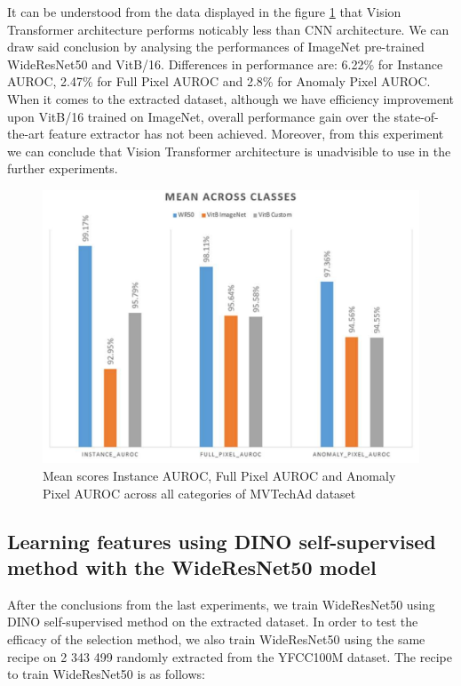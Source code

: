It can be understood from the data displayed in the figure \ref{fig:vit_custom_test} that Vision Transformer architecture performs noticably less than CNN architecture. We can draw said conclusion by analysing the performances of ImageNet pre-trained WideResNet50 and VitB/16. Differences in performance are: 6.22\% for Instance AUROC, 2.47\% for Full Pixel AUROC and 2.8\% for Anomaly Pixel AUROC. When it comes to the extracted dataset, although we have efficiency improvement upon VitB/16 trained on ImageNet, overall performance gain over the state-of-the-art feature extractor has not been achieved. Moreover, from this experiment we can conclude that Vision Transformer architecture is unadvisible to use in the further experiments.

\begin{figure}[h]
	\begin{center}
		\includegraphics[width=1.0\linewidth]{Chapter_4/vit_custom.png}
	\end{center}
	\caption{Mean scores Instance AUROC, Full Pixel AUROC and Anomaly Pixel AUROC across all categories of MVTechAd dataset}
	\label{fig:vit_custom_test}
\end{figure}

\subsection{Learning features using DINO self-supervised method with the WideResNet50 model}
After the conclusions from the last experiments, we train WideResNet50 using DINO self-supervised method on the extracted dataset. In order to test the efficacy of the selection method, we also train WideResNet50 using the same recipe on 2 343 499 randomly extracted from the YFCC100M dataset. The recipe to train WideResNet50 is as follows:


